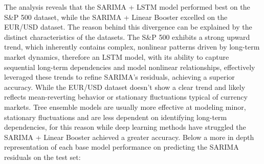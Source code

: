 \begin{table}[h]
    \centering
    \caption{Performance metrics of base models on eur/usd dataset}
    \label{tab:model performance on eur/usd}
\end{table}
The analysis reveals that the SARIMA + LSTM model performed best on the S\&P 500 dataset, while the SARIMA + Linear Booster excelled on the EUR/USD dataset. The reason behind this divergence can be explained by the distinct characteristics of the datasets. The S\&P 500 exhibits a strong upward trend, which inherently contains complex, nonlinear patterns driven by long-term market dynamics, therefore an LSTM model, with its ability to capture sequential long-term dependencies and model nonlinear relationships, effectively leveraged these trends to refine SARIMA’s residuals, achieving a superior accuracy. While the EUR/USD dataset doesn't show a clear trend and likely reflects mean-reverting behavior or stationary fluctuations typical of currency markets. Tree ensemble models are usually more effective at modeling minor, stationary fluctuations and are less dependent on identifying long-term dependencies, for this reason while deep learning methods have struggled the SARIMA + Linear Booster achieved a greater accuracy. Below a more in depth representation of each base model performance on predicting the SARIMA residuals on the test set: 
